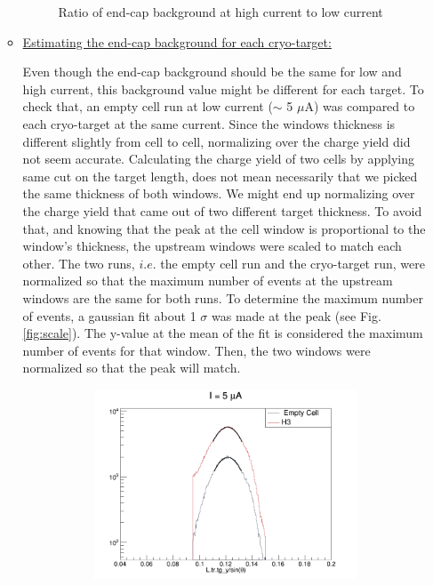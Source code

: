 \documentclass[11pt]{article}
\begin{document}
\begin{enumerate}
\begin{itemize}
\begin{figure}[H]
  \caption{Ratio of end-cap background at high current to low current}
  \label{fig:bk_empty}
\end{figure}
 \item{\underline{Estimating the end-cap background for each cryo-target:}\par
Even though the end-cap background should be the same for low and high current, this background value might be different for each target. To check that, an empty cell run at low current ($\sim$ 5 $\mu$A) was compared to each cryo-target at the same current. Since the windows thickness is different slightly from cell to cell, normalizing over the charge yield did not seem accurate. Calculating the charge yield of two cells by applying same cut on the target length, does not mean necessarily that we picked the same thickness of both windows. We might end up normalizing over the charge yield that came out of two different target thickness. To avoid that, and knowing that the peak at the cell window is proportional to the window's thickness, the upstream windows were scaled to match each other. The two runs, $i.e.$ the empty cell run and the cryo-target run, were normalized so that the maximum number of events at the upstream windows are the same for both runs. To determine the maximum number of events, a gaussian fit about 1 $\sigma$ was made at the peak (see Fig.\ref{fig:scale}). The y-value at the mean of the fit is considered the maximum number of events for that window. Then, the two windows were normalized so that the peak will match. 
\begin{figure}[H]
\centering
\begin{subfigure}{.4\textwidth}
\centering
 \includegraphics[width=\linewidth]{scale5_H3.png}

\end{subfigure}
\end{figure}}
\end{itemize}
\end{enumerate}
\end{document}
